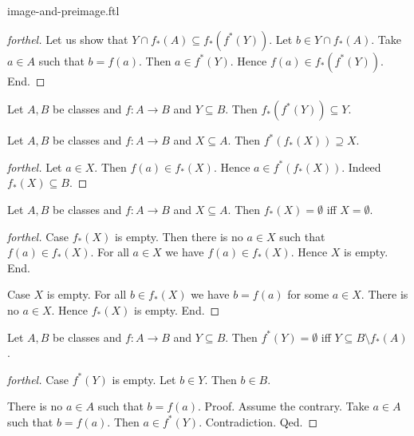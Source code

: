 \documentclass{naproche-library}
\begin{document}
\begin{smodule}{image-and-preimage.ftl}
\begin{proof}[forthel]
    Let us show that $Y \cap f_{*}(A) \subseteq f_{*}(f^{*}(Y))$.
      Let $b \in Y \cap f_{*}(A)$.
      Take $a \in A$ such that $b = f(a)$.
      Then $a \in f^{*}(Y)$.
      Hence $f(a) \in f_{*}(f^{*}(Y))$.
    End.
  \end{proof}

  \begin{corollary}[forthel,id=FOUNDATIONS_07_5585105345052672]
    Let $A, B$ be classes and $f : A \to B$ and $Y \subseteq B$.
    Then $f_{*}(f^{*}(Y)) \subseteq Y$.
  \end{corollary}

  \begin{proposition}[forthel,id=FOUNDATIONS_07_4890896170483712]
    Let $A, B$ be classes and $f : A \to B$ and $X \subseteq A$.
    Then $f^{*}(f_{*}(X)) \supseteq X$.
  \end{proposition}
  \begin{proof}[forthel]
    Let $a \in X$.
    Then $f(a) \in f_{*}(X)$.
    Hence $a \in f^{*}(f_{*}(X))$.
    Indeed $f_{*}(X) \subseteq B$.
  \end{proof}

  \begin{proposition}[forthel,id=FOUNDATIONS_07_3318372355801088]
    Let $A, B$ be classes and $f : A \to B$ and $X \subseteq A$.
    Then $f_{*}(X) = \emptyset$ iff $X = \emptyset$.
  \end{proposition}
  \begin{proof}[forthel]
    Case $f_{*}(X)$ is empty.
      Then there is no $a \in X$ such that $f(a) \in f_{*}(X)$.
      For all $a \in X$ we have $f(a) \in f_{*}(X)$.
      Hence $X$ is empty.
    End.

    Case $X$ is empty.
      For all $b \in f_{*}(X)$ we have $b = f(a)$ for some $a \in X$.
      There is no $a \in X$.
      Hence $f_{*}(X)$ is empty.
    End.
  \end{proof}

  \begin{proposition}[forthel,id=FOUNDATIONS_07_8597874786959360]
    Let $A, B$ be classes and $f : A \to B$ and $Y \subseteq B$.
    Then $f^{*}(Y) = \emptyset$ iff $Y \subseteq B \setminus f_{*}(A)$.
  \end{proposition}
  \begin{proof}[forthel]
    Case $f^{*}(Y)$ is empty.
      Let $b \in Y$.
      Then $b \in B$.

      There is no $a \in A$ such that $b = f(a)$. \newline
      Proof.
        Assume the contrary.
        Take $a \in A$ such that $b = f(a)$.
        Then $a \in f^{*}(Y)$.
        Contradiction.
      Qed.


\end{proof}
\end{smodule}
\end{document}
